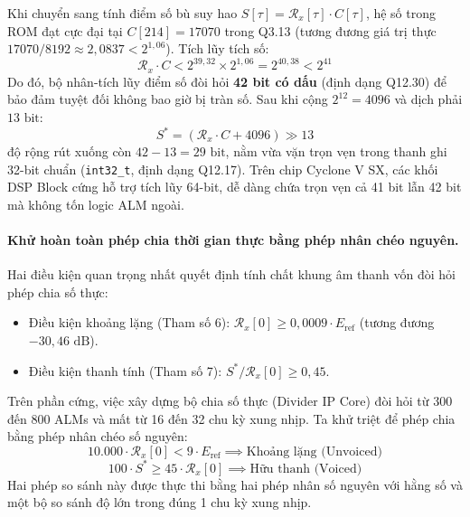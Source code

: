 \documentclass[11pt,a4paper]{article}
\begin{document}
Khi chuyển sang tính điểm số bù suy hao $S[\tau] = \mathcal{R}_x[\tau] \cdot C[\tau]$, hệ số trong ROM đạt cực đại tại $C[214] = 17070$ trong Q3.13 (tương đương giá trị thực $17070 / 8192 \approx 2{,}0837 < 2^{1{,}06}$). Tích lũy tích số:
\begin{equation}
\mathcal{R}_x \cdot C < 2^{39{,}32} \times 2^{1{,}06} = 2^{40{,}38} < 2^{41}
\end{equation}
Do đó, bộ nhân-tích lũy điểm số đòi hỏi \textbf{42 bit có dấu} (định dạng Q12.30) để bảo đảm tuyệt đối không bao giờ bị tràn số. Sau khi cộng $2^{12} = 4096$ và dịch phải $13\text{ bit}$:
\[
S^* = (\mathcal{R}_x \cdot C + 4096) \gg 13
\]
độ rộng rút xuống còn $42 - 13 = 29\text{ bit}$, nằm vừa vặn trọn vẹn trong thanh ghi 32-bit chuẩn (\texttt{int32\_t}, định dạng Q12.17). Trên chip Cyclone V SX, các khối DSP Block cứng hỗ trợ tích lũy 64-bit, dễ dàng chứa trọn vẹn cả 41 bit lẫn 42 bit mà không tốn logic ALM ngoài.

\paragraph{Khử hoàn toàn phép chia thời gian thực bằng phép nhân chéo nguyên.}
Hai điều kiện quan trọng nhất quyết định tính chất khung âm thanh vốn đòi hỏi phép chia số thực:
\begin{itemize}
    \setlength{\itemsep}{0.5pt}
    \item Điều kiện khoảng lặng (Tham số 6): $\mathcal{R}_x[0] \ge 0{,}0009 \cdot E_{\text{ref}}$ (tương đương $-30{,}46\text{ dB}$).
    \item Điều kiện thanh tính (Tham số 7): $S^* / \mathcal{R}_x[0] \ge 0{,}45$.
\end{itemize}
Trên phần cứng, việc xây dựng bộ chia số thực (Divider IP Core) đòi hỏi từ 300 đến 800 ALMs và mất từ 16 đến 32 chu kỳ xung nhịp. Ta khử triệt để phép chia bằng phép nhân chéo số nguyên:
\begin{equation}
10.000 \cdot \mathcal{R}_x[0] < 9 \cdot E_{\text{ref}} \implies \text{Khoảng lặng (Unvoiced)}
\end{equation}
\begin{equation}
100 \cdot S^* \ge 45 \cdot \mathcal{R}_x[0] \implies \text{Hữu thanh (Voiced)}
\end{equation}
Hai phép so sánh này được thực thi bằng hai phép nhân số nguyên với hằng số và một bộ so sánh độ lớn trong đúng 1 chu kỳ xung nhịp.
\end{document}
